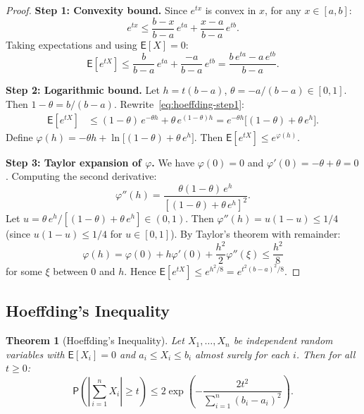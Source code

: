 \documentclass[14pt]{extarticle}
\theoremstyle{plain}
\newtheorem{theorem}{Theorem}[section]
\theoremstyle{definition}
\theoremstyle{remark}
\newcommand\expc{\mathsf{E}}
\newcommand\prb{\mathsf{P}}
\begin{document}
\begin{proof}
\textbf{Step 1: Convexity bound.} Since $e^{tx}$ is convex in $x$, for any $x \in [a, b]$:
\[
e^{tx} \leqslant \frac{b - x}{b - a}\,e^{ta} + \frac{x - a}{b - a}\,e^{tb}.
\]
Taking expectations and using $\expc[X] = 0$:
\begin{equation}\label{eq:hoeffding-step1}
\expc[e^{tX}] \leqslant \frac{b}{b - a}\,e^{ta} + \frac{-a}{b - a}\,e^{tb} = \frac{b\,e^{ta} - a\,e^{tb}}{b - a}.
\end{equation}

\textbf{Step 2: Logarithmic bound.} Let $h = t(b-a)$, $\theta = -a/(b-a) \in [0,1]$. Then $1 - \theta = b/(b-a)$. Rewrite~\eqref{eq:hoeffding-step1}:
\begin{align*}
\expc[e^{tX}] &\leqslant (1-\theta)\,e^{-\theta h} + \theta\,e^{(1-\theta)h} = e^{-\theta h}\bigl[(1-\theta) + \theta\,e^{h}\bigr].
\end{align*}
Define $\varphi(h) = -\theta h + \ln\bigl[(1-\theta) + \theta\,e^h\bigr]$. Then $\expc[e^{tX}] \leqslant e^{\varphi(h)}$.

\textbf{Step 3: Taylor expansion of $\varphi$.} We have $\varphi(0) = 0$ and $\varphi'(0) = -\theta + \theta = 0$. Computing the second derivative:
\[
\varphi''(h) = \frac{\theta(1-\theta)\,e^h}{[(1-\theta) + \theta\,e^h]^2}.
\]
Let $u = \theta\,e^h/[(1-\theta) + \theta\,e^h] \in (0,1)$. Then $\varphi''(h) = u(1-u) \leqslant 1/4$ (since $u(1-u) \leqslant 1/4$ for $u \in [0,1]$). By Taylor's theorem with remainder:
\[
\varphi(h) = \varphi(0) + h\varphi'(0) + \frac{h^2}{2}\varphi''(\xi) \leqslant \frac{h^2}{8}
\]
for some $\xi$ between $0$ and $h$. Hence $\expc[e^{tX}] \leqslant e^{h^2/8} = e^{t^2(b-a)^2/8}$.
\end{proof}

\subsection{Hoeffding's Inequality}

\begin{theorem}[Hoeffding's Inequality]\label{thm:hoeffding}
Let $X_1, \ldots, X_n$ be independent random variables with $\expc[X_i] = 0$ and $a_i \leqslant X_i \leqslant b_i$ almost surely for each $i$. Then for all $t \geqslant 0$:
\begin{equation}\label{eq:hoeffding}
\boxed{\prb\!\left(\left|\sum_{i=1}^n X_i\right| \geqslant t\right) \leqslant 2\exp\!\left(-\frac{2t^2}{\sum_{i=1}^n (b_i - a_i)^2}\right).}
\end{equation}
\end{theorem}
\end{document}
